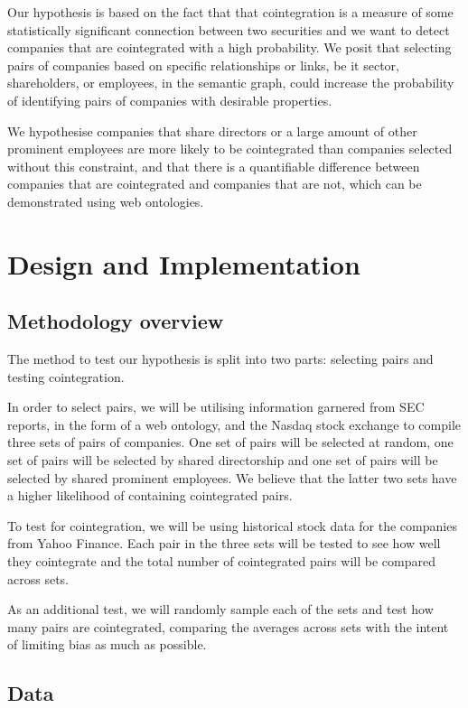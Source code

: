 \documentclass{UoYCSproject}
\begin{document}
Our hypothesis is based on the fact that that cointegration is a measure of some statistically significant connection between two securities and we want to detect companies that are cointegrated with a high probability. We posit that selecting pairs of companies based on specific relationships or links, be it sector, shareholders, or employees, in the semantic graph, could increase the probability of identifying pairs of companies with desirable properties. 

We hypothesise companies that share directors or a large amount of other prominent employees are more likely to be cointegrated than companies selected without this constraint, and that there is a quantifiable difference between companies that are cointegrated and companies that are not, which can be demonstrated using web ontologies.

\chapter{Design and Implementation}
\label{cha:Design and Implementation}

\section{Methodology overview}

The method to test our hypothesis is split into two parts: selecting pairs and testing cointegration.

In order to select pairs, we will be utilising information garnered from SEC reports, in the form of a web ontology, and the Nasdaq stock exchange to compile three sets of pairs of companies. One set of pairs will be selected at random, one set of pairs will be selected by shared directorship and one set of pairs will be selected by shared prominent employees. We believe that the latter two sets have a higher likelihood of containing cointegrated pairs.

To test for cointegration, we will be using historical stock data for the companies from Yahoo Finance. Each pair in the three sets will be tested to see how well they cointegrate and the total number of cointegrated pairs will be compared across sets.

As an additional test, we will randomly sample each of the sets and test how many pairs are cointegrated, comparing the averages across sets with the intent of limiting bias as much as possible.

\section{Data}
\end{document}
